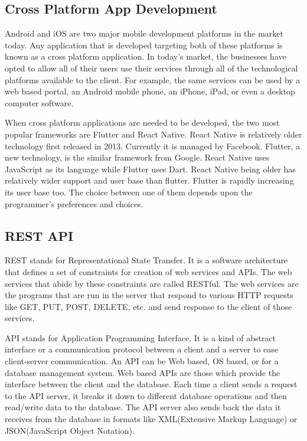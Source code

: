 \documentclass[12pt, a4paper, oneside]{article}
\begin{document}
\subsection{Cross Platform App Development}
Android and iOS are two major mobile development platforms in the market today. Any application that is developed targeting both of these platforms is known as a cross platform application. In today's market, the businesses have opted to allow all of their users use their services through all of the technological platforms available to the client. For example, the same services can be used by a web based portal, an Android mobile phone, an iPhone, iPad, or even a desktop computer software.

When cross platform applications are needed to be developed, the two most popular frameworks are Flutter and React Native. React Native is relatively older technology first released in 2013. Currently it is managed by Facebook. Flutter, a new technology, is the similar framework from Google. React Native uses JavaScript as its language while Flutter uses Dart. React Native being older has relatively wider support and user base than flutter. Flutter is rapidly increasing its user base too. The choice between one of them depends upon the programmer's preferences and choices.

\subsection{REST API}
REST stands for Representational State Transfer. It is a software architecture that defines a set of constraints for creation of web services and APIs. The web services that abide by these constraints are called RESTful. The web services are the programs that are run in the server that respond to various HTTP requests like GET, PUT, POST, DELETE, etc. and send response to the client of those services.

API stands for Application Programming Interface. It is a kind of abstract interface or a communication protocol between a client and a server to ease client-server communication. An API can be Web based, OS based, or for a database management system. Web based APIs are those which provide the interface between the client and the database. Each time a client sends a request to the API server, it breaks it down to different database operations and then read/write data to the database. The API server also sends back the data it receives from the database in formats like XML(Extensive Markup Language) or JSON(JavaScript Object Notation).
\end{document}
